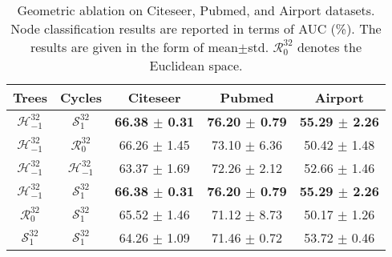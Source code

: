 \begin{table}[t]
\centering %
\caption{Geometric ablation on Citeseer, Pubmed, and Airport datasets. Node classification results are reported in terms of AUC (\%). The results are given in the form of mean$\pm$std. $\mathcal R^{32}_{0}$ denotes the Euclidean space.}
         \vspace{-0.03in}
\label{tab:geo-ablation-2}
\begin{tabular}{cc|c c c}
\hline
\textbf{Trees} & \textbf{Cycles} & \textbf{Citeseer} & \textbf{Pubmed} & \textbf{Airport} \\
\hline
$\mathcal H^{32}_{-1}$&$\mathcal S^{32}_{1}$
& \textbf{66.38 $\pm$ 0.31}
& \textbf{76.20 $\pm$ 0.79}
& \textbf{55.29 $\pm$ 2.26} \\
$\mathcal H^{32}_{-1}$&$\mathcal R^{32}_{0}$
& 66.26 $\pm$ 1.45 & 73.10 $\pm$ 6.36 & 50.42 $\pm$ 1.48 \\
$\mathcal H^{32}_{-1}$&$\mathcal H^{32}_{-1}$
& 63.37 $\pm$ 1.69 & 72.26 $\pm$ 2.12 & 52.66 $\pm$ 1.46\\
\hline
$\mathcal H^{32}_{-1}$&$\mathcal S^{32}_{1}$
& \textbf{66.38 $\pm$ 0.31}
& \textbf{76.20 $\pm$ 0.79}
& \textbf{55.29 $\pm$ 2.26}\\
$\mathcal R^{32}_{0}$ &$\mathcal S^{32}_{1}$
& 65.52 $\pm$ 1.46 & 71.12 $\pm$ 8.73 & 50.17 $\pm$ 1.26 \\
$\mathcal S^{32}_{1}$ &$\mathcal S^{32}_{1}$
& 64.26 $\pm$ 1.09 & 71.46 $\pm$ 0.72 & 53.72 $\pm$ 0.46 \\
\hline
\end{tabular}
         \vspace{-0.05in}
\end{table}

